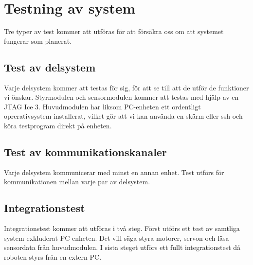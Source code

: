 \section{Testning av system}
Tre typer av test kommer att utföras för att försäkra oss om att systemet fungerar som planerat.

\subsection{Test av delsystem}
Varje delsystem kommer att testas för sig, för att se till att de utför de funktioner vi önskar. Styrmodulen och sensormodulen kommer att testas med hjälp av en JTAG Ice 3. Huvudmodulen har liksom PC-enheten ett ordentligt oprerativsystem installerat, vilket gör att vi kan använda en skärm eller ssh och köra testprogram direkt på enheten. 

\subsection{Test av kommunikationskanaler}
Varje delsystem kommunicerar med minst en annan enhet. Test utförs för kommunikationen mellan varje par av delsystem. 

\subsection{Integrationstest}
Integrationstest kommer att utföras i två steg. Först utförs ett test av samtliga system exkluderat PC-enheten. Det vill säga styra motorer, servon och läsa sensordata från huvudmodulen. I sista steget utförs ett fullt integrationstest då roboten styrs från en extern PC.
